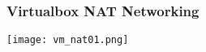 \begin{frame}
\frametitle{Virtualbox NAT Networking}
    \center\texttt{[image: vm\_nat01.png]}
\end{frame}
